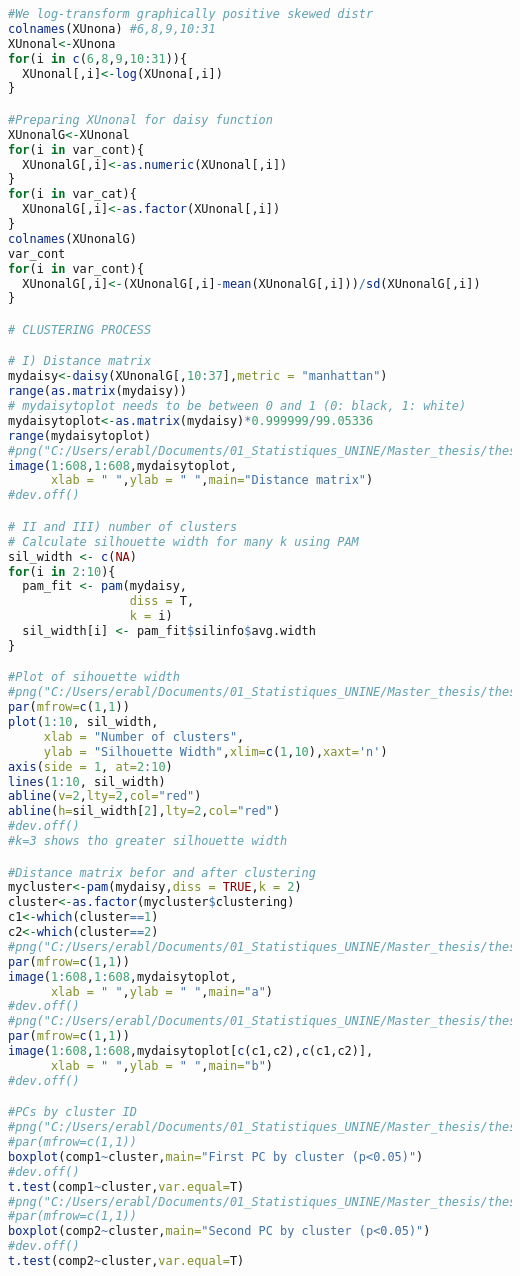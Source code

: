 \documentclass[a4paper]{book}
\begin{document}
\begin{lstlisting}[language=R]
#We log-transform graphically positive skewed distr
colnames(XUnona) #6,8,9,10:31
XUnonal<-XUnona
for(i in c(6,8,9,10:31)){
  XUnonal[,i]<-log(XUnona[,i])
}

#Preparing XUnonal for daisy function
XUnonalG<-XUnonal
for(i in var_cont){
  XUnonalG[,i]<-as.numeric(XUnonal[,i])
}
for(i in var_cat){
  XUnonalG[,i]<-as.factor(XUnonal[,i])
}
colnames(XUnonalG)
var_cont
for(i in var_cont){
  XUnonalG[,i]<-(XUnonalG[,i]-mean(XUnonalG[,i]))/sd(XUnonalG[,i])
}

# CLUSTERING PROCESS

# I) Distance matrix
mydaisy<-daisy(XUnonalG[,10:37],metric = "manhattan")
range(as.matrix(mydaisy))
# mydaisytoplot needs to be between 0 and 1 (0: black, 1: white)
mydaisytoplot<-as.matrix(mydaisy)*0.999999/99.05336
range(mydaisytoplot)
#png("C:/Users/erabl/Documents/01_Statistiques_UNINE/Master_thesis/thesis2/figures/distancematrix.png")
image(1:608,1:608,mydaisytoplot,
      xlab = " ",ylab = " ",main="Distance matrix")
#dev.off()

# II and III) number of clusters
# Calculate silhouette width for many k using PAM
sil_width <- c(NA)
for(i in 2:10){
  pam_fit <- pam(mydaisy,
                 diss = T,
                 k = i)
  sil_width[i] <- pam_fit$silinfo$avg.width
}

#Plot of sihouette width
#png("C:/Users/erabl/Documents/01_Statistiques_UNINE/Master_thesis/thesis2/figures/silhouette.png")
par(mfrow=c(1,1))
plot(1:10, sil_width,
     xlab = "Number of clusters",
     ylab = "Silhouette Width",xlim=c(1,10),xaxt='n')
axis(side = 1, at=2:10)
lines(1:10, sil_width)
abline(v=2,lty=2,col="red")
abline(h=sil_width[2],lty=2,col="red")
#dev.off()
#k=3 shows tho greater silhouette width

#Distance matrix befor and after clustering
mycluster<-pam(mydaisy,diss = TRUE,k = 2)
cluster<-as.factor(mycluster$clustering)
c1<-which(cluster==1)
c2<-which(cluster==2)
#png("C:/Users/erabl/Documents/01_Statistiques_UNINE/Master_thesis/thesis2/figures/dma.png",width = 404,height = 404)
par(mfrow=c(1,1))
image(1:608,1:608,mydaisytoplot,
      xlab = " ",ylab = " ",main="a")
#dev.off()
#png("C:/Users/erabl/Documents/01_Statistiques_UNINE/Master_thesis/thesis2/figures/dmb.png",width = 404,height = 404)
par(mfrow=c(1,1))
image(1:608,1:608,mydaisytoplot[c(c1,c2),c(c1,c2)],
      xlab = " ",ylab = " ",main="b")
#dev.off()

#PCs by cluster ID
#png("C:/Users/erabl/Documents/01_Statistiques_UNINE/Master_thesis/thesis2/figures/ttestc1.png",width = 404,height = 404)
#par(mfrow=c(1,1))
boxplot(comp1~cluster,main="First PC by cluster (p<0.05)")
#dev.off()
t.test(comp1~cluster,var.equal=T)
#png("C:/Users/erabl/Documents/01_Statistiques_UNINE/Master_thesis/thesis2/figures/ttestc2.png",width = 404,height = 404)
#par(mfrow=c(1,1))
boxplot(comp2~cluster,main="Second PC by cluster (p<0.05)")
#dev.off()
t.test(comp2~cluster,var.equal=T)


\end{lstlisting}
\end{document}
